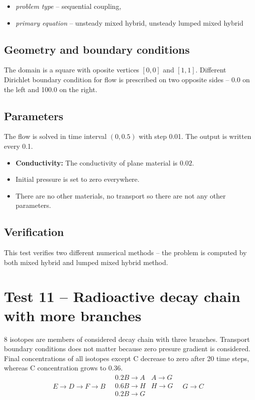 \begin{itemize} 
    \item \emph{problem type} -- sequential coupling, 
    \item \emph{primary equation} -- unsteady mixed hybrid, unsteady lumped mixed hybrid
  \end{itemize}

\subsection*{Geometry and boundary conditions}
The domain is a square with oposite vertices $[0,0]$ and $[1,1]$. Different Dirichlet boundary condition for flow is prescribed on two opposite sides -- 0.0 on the left and 100.0 on the right.

\subsection*{Parameters}
The flow is solved in time interval $(0,0.5)$ with step 0.01. The output is written every 0.1.
\begin{itemize}
  \item \textbf{Conductivity:} The conductivity of plane material is $0.02$.
  \item Initial pressure is set to zero everywhere.
  \item There are no other materials, no transport so there are not any other parameters.
\end{itemize}

\subsection*{Verification}
This test verifies two different numerical methods -- the problem is computed by both mixed hybrid and lumped mixed hybrid method.


\section{Test 11 -- Radioactive decay chain with more branches}
8 isotopes are members of considered decay chain with three branches. Transport boundary conditions does not matter because zero presure gradient is considered. Final concentrations of all isotopes except C decrease to zero after 20 time steps, whereas C concentration grows to 0.36.
\[
 E\xrightarrow{}D\xrightarrow{}F\xrightarrow{}B
 \quad
 \begin{matrix}
    0.2B\xrightarrow{}A & A\xrightarrow{}G \\
    0.6B\xrightarrow{}H & H\xrightarrow{}G \\
    0.2B\xrightarrow{}G &\\
 \end{matrix}
 \quad
 G\xrightarrow{}C 
\]

